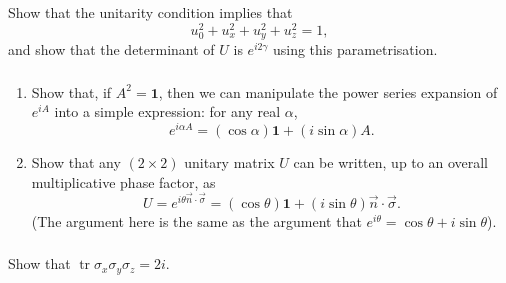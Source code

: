 \documentclass[fleqn]{article}
\begin{document}
Show that the unitarity condition implies that
\[
  u_0^2 + u_x^2 + u_y^2 + u_z^2 = 1,
\]
and show that the determinant of \(U\) is \(e^{i2\gamma}\) using this parametrisation.

\hypertarget{section-17}{%
\subsubsection{}\label{section-17}}

\begin{enumerate}
\def\labelenumi{\arabic{enumi}.}
\item
  Show that, if \(A^2=\mathbf{1}\), then we can manipulate the power series expansion of \(e^{iA}\) into a simple expression: for any real \(\alpha\),
  \[
     e^{i\alpha A}
     = (\cos\alpha)\mathbf{1}+ (i\sin\alpha)A.
   \]
\item
  Show that any \((2\times 2)\) unitary matrix \(U\) can be written, up to an overall multiplicative phase factor, as
  \[
     U
     = e^{i \theta \vec{n}\cdot\vec{\sigma}}
     = (\cos\theta)\mathbf{1}+ (i\sin\theta)\vec{n}\cdot\vec{\sigma}.
   \]
  (The argument here is the same as the argument that \(e^{i\theta}=\cos\theta +i\sin\theta\)).
\end{enumerate}

\hypertarget{section-18}{%
\subsubsection{}\label{section-18}}

Show that \(\operatorname{tr}\sigma_x\sigma_y\sigma_z = 2i\).

\hypertarget{section-19}{%
\subsubsection{}\label{section-19}}
\end{document}
